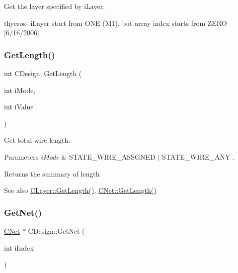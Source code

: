 Get the layer specified by i\+Layer. 

thyeros-\/ i\+Layer start from O\+NE (M1), but array index starts from Z\+E\+RO \mbox{[}6/16/2006\mbox{]} \mbox{\label{classCDesign_a2ff679a94a04886d69604e7d6820830b}} 
\subsubsection{\texorpdfstring{GetLength()}{GetLength()}}
{\footnotesize\ttfamily int C\+Design\+::\+Get\+Length (\begin{DoxyParamCaption}\item[{int}]{i\+Mode,  }\item[{int}]{i\+Value }\end{DoxyParamCaption})}



Get total wire length. 


\begin{DoxyParams}{Parameters}
{\em i\+Mode} & S\+T\+A\+T\+E\+\_\+\+W\+I\+R\+E\+\_\+\+A\+S\+S\+G\+N\+ED $\vert$ S\+T\+A\+T\+E\+\_\+\+W\+I\+R\+E\+\_\+\+A\+NY .\\
\hline
\end{DoxyParams}
\begin{DoxyReturn}{Returns}
the summary of length
\end{DoxyReturn}
\begin{DoxySeeAlso}{See also}
\mbox{\hyperlink{classCLayer_a4e139423a04a8dd850ded7e9185c0a89}{C\+Layer\+::\+Get\+Length()}}, \mbox{\hyperlink{classCNet_a8712e8f595e036e1e5c693100d071e38}{C\+Net\+::\+Get\+Length()}} 
\end{DoxySeeAlso}
\mbox{\label{classCDesign_a88d8a50b50adf87e7d53b52757f5a04c}} 
\subsubsection{\texorpdfstring{GetNet()}{GetNet()}}
{\footnotesize\ttfamily \mbox{\hyperlink{classCNet}{C\+Net}} $\ast$ C\+Design\+::\+Get\+Net (\begin{DoxyParamCaption}\item[{int}]{i\+Index }\end{DoxyParamCaption})}



